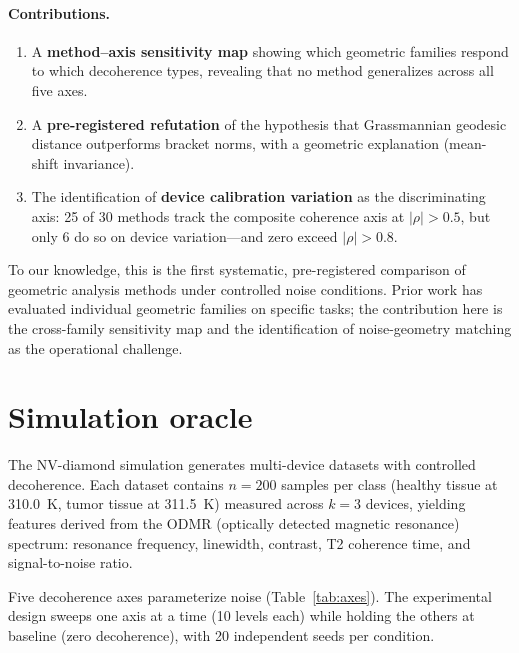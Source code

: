 \documentclass[11pt]{article}
\begin{document}
\paragraph{Contributions.}
\begin{enumerate}
  \item A \textbf{method--axis sensitivity map} showing which geometric
    families respond to which decoherence types, revealing that no method
    generalizes across all five axes.
  \item A \textbf{pre-registered refutation} of the hypothesis that
    Grassmannian geodesic distance outperforms bracket norms, with a
    geometric explanation (mean-shift invariance).
  \item The identification of \textbf{device calibration variation} as
    the discriminating axis: 25 of 30 methods track the composite
    coherence axis at $|\rho| > 0.5$, but only 6 do so on device
    variation---and zero exceed $|\rho| > 0.8$.
\end{enumerate}

To our knowledge, this is the first systematic, pre-registered
comparison of geometric analysis methods under controlled noise
conditions.  Prior work has evaluated individual geometric families on
specific tasks; the contribution here is the cross-family sensitivity
map and the identification of noise-geometry matching as the
operational challenge.

\section{Simulation oracle}
\label{sec:oracle}

The NV-diamond simulation generates multi-device datasets with controlled
decoherence.  Each dataset contains $n = 200$ samples per class (healthy
tissue at 310.0~K, tumor tissue at 311.5~K) measured across $k = 3$
devices, yielding features derived from the ODMR (optically detected
magnetic resonance) spectrum: resonance frequency, linewidth, contrast,
T2 coherence time, and signal-to-noise ratio.

Five decoherence axes parameterize noise (Table~\ref{tab:axes}).  The
experimental design sweeps one axis at a time (10 levels each) while
holding the others at baseline (zero decoherence), with 20 independent
seeds per condition.
\end{document}
